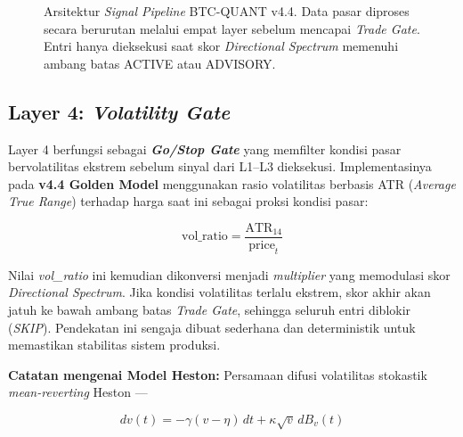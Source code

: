 \begin{figure}[h!]
\caption{Arsitektur \textit{Signal Pipeline} BTC-QUANT v4.4. Data pasar diproses secara berurutan melalui empat layer sebelum mencapai \textit{Trade Gate}. Entri hanya dieksekusi saat skor \textit{Directional Spectrum} memenuhi ambang batas ACTIVE atau ADVISORY.}
\label{fig:architecture}
\end{figure}

\subsection{Layer 4: \textit{Volatility Gate}}

Layer 4 berfungsi sebagai \textbf{\textit{Go/Stop Gate}} yang memfilter kondisi pasar bervolatilitas ekstrem sebelum sinyal dari L1--L3 dieksekusi. Implementasinya pada \textbf{v4.4 Golden Model} menggunakan rasio volatilitas berbasis ATR (\textit{Average True Range}) terhadap harga saat ini sebagai proksi kondisi pasar:

\begin{equation}
    \text{vol\_ratio} = \frac{\text{ATR}_{14}}{\text{price}_t}
\end{equation}

Nilai \textit{vol\_ratio} ini kemudian dikonversi menjadi \textit{multiplier} yang memodulasi skor \textit{Directional Spectrum}. Jika kondisi volatilitas terlalu ekstrem, skor akhir akan jatuh ke bawah ambang batas \textit{Trade Gate}, sehingga seluruh entri diblokir (\textit{SKIP}). Pendekatan ini sengaja dibuat sederhana dan deterministik untuk memastikan stabilitas sistem produksi.

\textbf{Catatan mengenai Model Heston:} Persamaan difusi volatilitas stokastik \textit{mean-reverting} Heston \cite{heston1993closed} ---

\begin{equation}
    dv(t) = -\gamma(v - \eta)\,dt + \kappa \sqrt{v}\, dB_v(t)
\end{equation}

